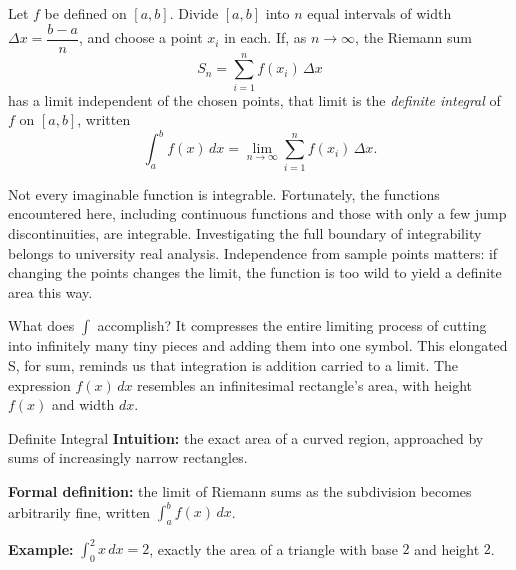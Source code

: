 \begin{dingyi}
Let $f$ be defined on $[a,b]$. Divide $[a,b]$ into $n$ equal intervals of width $\Delta x=\dfrac{b-a}{n}$, and choose a point $x_i$ in each. If, as $n\to\infty$, the Riemann sum
\[
S_n=\sum_{i=1}^{n} f(x_i)\,\Delta x
\]
has a limit independent of the chosen points, that limit is the \emph{definite integral} of $f$ on $[a,b]$, written
\[
\int_a^b f(x)\,dx=\lim_{n\to\infty}\sum_{i=1}^{n} f(x_i)\,\Delta x .
\]
\end{dingyi}

\begin{zhu}
Not every imaginable function is integrable. Fortunately, the functions encountered here, including continuous functions and those with only a few jump discontinuities, are integrable. Investigating the full boundary of integrability belongs to university real analysis. Independence from sample points matters: if changing the points changes the limit, the function is too wild to yield a definite area this way.
\end{zhu}

\begin{center}
\end{center}

What does $\int$ accomplish? It compresses the entire limiting process of cutting into infinitely many tiny pieces and adding them into one symbol. This elongated S, for sum, reminds us that integration is addition carried to a limit. The expression $f(x)\,dx$ resembles an infinitesimal rectangle's area, with height $f(x)$ and width $dx$.

\begin{shuyu}{Definite Integral}
\textbf{Intuition:} the exact area of a curved region, approached by sums of increasingly narrow rectangles.

\textbf{Formal definition:} the limit of Riemann sums as the subdivision becomes arbitrarily fine, written $\int_a^b f(x)\,dx$.

\textbf{Example:} $\int_0^2 x\,dx=2$, exactly the area of a triangle with base $2$ and height $2$.
\end{shuyu}

